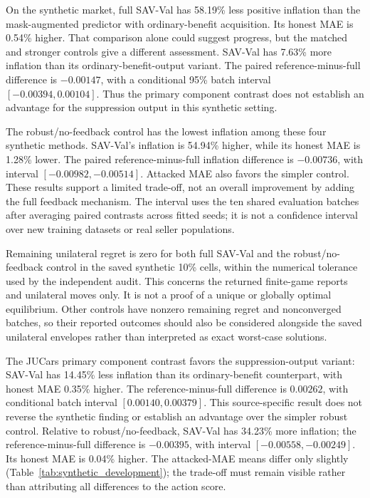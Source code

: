 On the synthetic market, full SAV-Val has 58.19\% less positive inflation than the mask-augmented
predictor with ordinary-benefit acquisition. Its honest MAE is 0.54\%
higher. That comparison alone could suggest progress, but the matched
and stronger controls give a different assessment. SAV-Val has 7.63\%
more inflation than its ordinary-benefit-output variant. The paired
reference-minus-full difference is $-0.00147$, with a conditional
95\% batch interval $[-0.00394,0.00104]$. Thus the primary component
contrast does not establish an advantage for the suppression output in
this synthetic setting.

The robust/no-feedback control has the lowest inflation among these
four synthetic methods. SAV-Val's inflation is 54.94\% higher, while its honest
MAE is 1.28\% lower. The paired reference-minus-full inflation difference
is $-0.00736$, with interval $[-0.00982,-0.00514]$. Attacked MAE also
favors the simpler control. These results support a limited trade-off,
not an overall improvement by adding the full feedback mechanism.
The interval uses the ten shared evaluation batches after averaging
paired contrasts across fitted seeds; it is not a confidence interval
over new training datasets or real seller populations.

Remaining unilateral regret is zero for both full SAV-Val and the
robust/no-feedback control in the saved synthetic 10\% cells, within
the numerical tolerance used by the independent audit. This concerns
the returned finite-game reports and unilateral moves only. It is not
a proof of a unique or globally optimal equilibrium. Other controls
have nonzero remaining regret and nonconverged batches, so their
reported outcomes should also be considered alongside the saved
unilateral envelopes rather than interpreted as exact worst-case
solutions.

The JUCars primary component contrast favors the suppression-output
variant: SAV-Val has 14.45\% less inflation than its ordinary-benefit
counterpart, with honest MAE 0.35\% higher. The reference-minus-full
difference is $0.00262$, with conditional batch interval
$[0.00140,0.00379]$. This source-specific result does not reverse the
synthetic finding or establish an advantage over the simpler robust
control. Relative to robust/no-feedback, SAV-Val has 34.23\% more
inflation; the reference-minus-full difference is $-0.00395$, with
interval $[-0.00558,-0.00249]$. Its honest MAE is 0.04\% higher.
The attacked-MAE means differ only slightly (Table~\ref{tab:synthetic_development});
the trade-off must remain visible rather than attributing all differences
to the action score.

